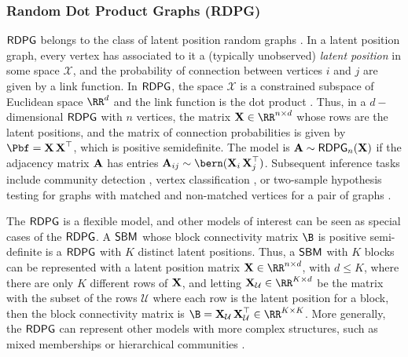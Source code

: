 \subsubsection{Random Dot Product Graphs (RDPG)}\label{sec:rdpg}
$\operatorname{\mathsf{RDPG}}$ belongs to the class of latent position random graphs \cite{hoff2002latent}. In a latent position graph, every vertex has associated to it a (typically unobserved) \textit{latent position} in some space $\mathcal{X}$, and the probability of connection between vertices $i$ and $j$ are given by a link function. In $\operatorname{\mathsf{RDPG}}$, the space $\mathcal{X}$ is a constrained subspace of Euclidean space $\RR^d$ and the link function is the dot product \cite{Young2007-vu,scheinerman2010modeling,Sussman2014-zq}. Thus, in a $d-$dimensional $\operatorname{\mathsf{RDPG}}$ with $n$ vertices, the matrix $\X\in \RR^{n\times d}$ whose rows are the latent positions, and the matrix of connection probabilities is given by $\Pbf=\X\X^\top$, which is positive semidefinite. The model is $\operatorname{\mathbf{A}}\sim \operatorname{\mathsf{RDPG}}_n(\operatorname{\mathbf{X}})$ if the adjacency matrix $\operatorname{\mathbf{A}}$ has entries $\A_{ij} \sim \bern(\X_i\X_j^\top)$.
Subsequent inference tasks include community detection \cite{sussman2012consistent}, vertex classification \cite{tang2013}, or two-sample hypothesis testing for graphs with matched and non-matched vertices for a pair of graphs  \cite{priebe2019two,tang2017nonparametric,tang2017semiparametric}.

The $\operatorname{\mathsf{RDPG}}$ is a flexible model, and other models of interest can be seen as special cases of the $\operatorname{\mathsf{RDPG}}$. A $\operatorname{\mathsf{SBM}}$ whose block connectivity matrix $\B$ is positive semi-definite is a $\operatorname{\mathsf{RDPG}}$ with $K$ distinct latent positions. Thus, a $\operatorname{\mathsf{SBM}}$ with $K$ blocks can be represented with a latent position matrix $\X\in\RR^{n\times d}$, with $d\leq K$, where there are only $K$ different rows of $\operatorname{\mathbf{X}}$, and letting $\X_{\mathcal{U}}\in\RR^{K\times d}$ be the matrix with the subset of the rows $\mathcal{U}$ where each row is the latent position for a block, then the block connectivity matrix is $\B= \X_\mathcal{U}\X_\mathcal{U}^\top \in\RR^{K\times K}$. More generally, the $\operatorname{\mathsf{RDPG}}$ can represent other models with more complex structures, such as mixed memberships \cite{Airoldi2008-tp} or hierarchical communities \cite{Lyzinski2017-cq}.


